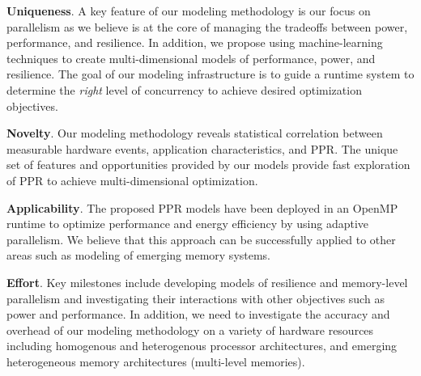 \documentclass{article}  %
\begin{document}
\noindent\textbf{Uniqueness}.
A key feature of our modeling methodology is our focus on
parallelism as we believe is at the core of managing the tradeoffs
between power, performance, and resilience. In addition, we propose
using machine-learning techniques to create multi-dimensional models
of performance, power, and resilience. The goal of our modeling
infrastructure is to guide a runtime system to determine the
\emph{right} level of concurrency to achieve desired optimization
objectives. 


\noindent\textbf{Novelty}. 
Our modeling methodology reveals statistical correlation
between measurable hardware events, application characteristics, and 
PPR. The unique set of features and opportunities provided by our models
provide fast exploration of PPR to achieve multi-dimensional optimization.     

\noindent\textbf{Applicability}. 
The proposed PPR models have been deployed in an OpenMP runtime to
optimize performance and energy efficiency by using adaptive
parallelism. We believe that this approach can be successfully applied
to other areas such as modeling of emerging memory systems. 


\noindent\textbf{Effort}. 
Key milestones include developing models
of resilience and memory-level parallelism and investigating their
interactions with other 
objectives such as power and performance. In addition, we need to
investigate the accuracy and overhead of our modeling methodology on a
variety of hardware  resources including homogenous and heterogenous
processor 
architectures, and emerging heterogeneous memory architectures
(multi-level memories). 




\end{document}
